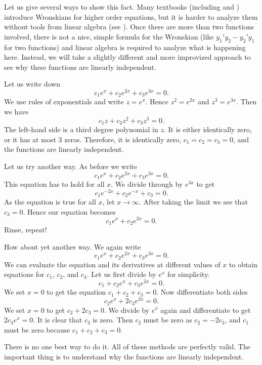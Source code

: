 \begin{exampleSol}
Let us give several ways to show this fact.
Many textbooks (including \cite{EP} and
\cite{F}) introduce Wronskians for higher order equations, but it is harder to analyze them without tools from linear algebra (see ). Once there are more than two functions involved, there is not a nice, simple formula for the Wronskian (like $y_1'y_2 - y_2'y_1$ for two functions) and linear algebra is required to analyze what is happening here. Instead, we will take a slightly different and more improvized approach to see why these functions are linearly independent.

Let us write down
\begin{equation*}
c_1 e^x + c_2 e^{2x} + c_3 e^{3x} = 0.
\end{equation*}
We use rules of exponentials and write $z = e^x$.  Hence $z^2 = e^{2x}$
and $z^3 = e^{3x}$.  Then we have
\begin{equation*}
c_1 z + c_2 z^2 + c_3 z^3 = 0.
\end{equation*}
The left-hand side is a third degree polynomial in $z$.
It is either identically zero,
or it has at most 3 zeros.  Therefore, it is identically zero,
$c_1 = c_2 = c_3 = 0$, and the functions are linearly independent.

Let us try another way.  As before we write
\begin{equation*}
c_1 e^x + c_2 e^{2x} + c_3 e^{3x} = 0.
\end{equation*}
This equation has to hold for all $x$.  We divide through
by $e^{3x}$ to get
\begin{equation*}
c_1 e^{-2x} + c_2 e^{-x} + c_3 = 0.
\end{equation*}
As the equation is true for all $x$, let $x \to \infty$.  After taking the
limit we see that $c_3 = 0$.  Hence our equation becomes
\begin{equation*}
c_1 e^x + c_2 e^{2x} = 0.
\end{equation*}
Rinse, repeat!

How about yet another way.  We again write
\begin{equation*}
c_1 e^x + c_2 e^{2x} + c_3 e^{3x} = 0.
\end{equation*}
We can evaluate the equation and its derivatives at different
values of $x$ to obtain equations for
$c_1$, $c_2$, and $c_3$.
Let us first
divide by $e^{x}$ for simplicity.
\begin{equation*}
c_1 + c_2 e^{x} + c_3 e^{2x} = 0.
\end{equation*}
We set $x=0$ to get the equation $c_1 + c_2 + c_3 = 0$.  Now differentiate
both sides
\begin{equation*}
c_2 e^{x} + 2 c_3 e^{2x} = 0 .
\end{equation*}
We set $x=0$ to get $c_2 + 2c_3 = 0$.  We divide by $e^x$ again and
differentiate to get
$2 c_3 e^{x} = 0$.  It is clear that $c_3$ is zero.  Then $c_2$ must be
zero as $c_2 = -2c_3$, and $c_1$ must be zero because $c_1 + c_2 + c_3 = 0$.

There is no one best way to do it.  All of these methods are perfectly valid.
The important thing is to understand why the functions are linearly
independent.
\end{exampleSol}

